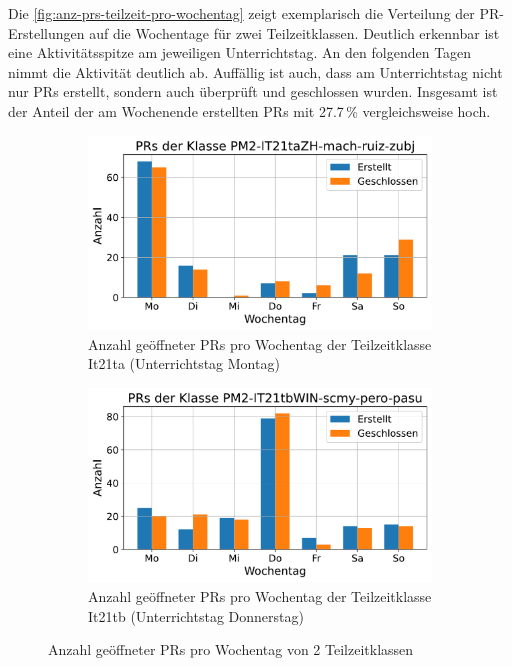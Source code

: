 Die \autoref{fig:anz-prs-teilzeit-pro-wochentag} zeigt exemplarisch die Verteilung der PR-Erstellungen auf die Wochentage für zwei Teilzeitklassen. Deutlich erkennbar ist eine Aktivitätsspitze am jeweiligen Unterrichtstag. An den folgenden Tagen nimmt die Aktivität deutlich ab. Auffällig ist auch, dass am Unterrichtstag nicht nur PRs erstellt, sondern auch überprüft und geschlossen wurden. Insgesamt ist der Anteil der am Wochenende erstellten PRs mit 27.7\,\% vergleichsweise hoch.

\begin{figure}[htbp]
    \centering
    \begin{subfigure}[b]{0.48\textwidth}
        \centering
        \includegraphics[width=\textwidth]{Figures/pr-klasse-per-wochentag-it21ta.pdf}
         \caption{Anzahl geöffneter PRs pro Wochentag der Teilzeitklasse It21ta (Unterrichtstag Montag)}
        \label{fig:anzahl-prs-pro-wochentag-it21ta}
    \end{subfigure}
    \hfill
    \begin{subfigure}[b]{0.48\textwidth}
        \centering
        \includegraphics[width=\textwidth]{Figures/pr-klasse-per-wochentag-21tb.pdf}
         \caption{Anzahl geöffneter PRs pro Wochentag der Teilzeitklasse It21tb (Unterrichtstag Donnerstag)}
        \label{fig:anzahl-prs-pro-wochentag-it21tb}
    \end{subfigure}
    \caption{Anzahl geöffneter PRs pro Wochentag von 2 Teilzeitklassen}
    \label{fig:anz-prs-teilzeit-pro-wochentag}
\end{figure}

